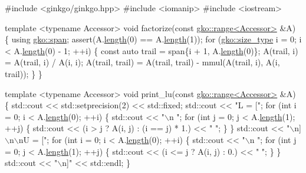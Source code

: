 \begin{DoxyCodeInclude}
\textcolor{preprocessor}{#include <ginkgo/ginkgo.hpp>}
\textcolor{preprocessor}{#include <iomanip>}
\textcolor{preprocessor}{#include <iostream>}


\textcolor{keyword}{template} <\textcolor{keyword}{typename} Accessor>
\textcolor{keywordtype}{void} factorize(\textcolor{keyword}{const} \hyperlink{classgko_1_1range}{gko::range<Accessor>} &A)
\{
    \textcolor{keyword}{using} \hyperlink{structgko_1_1span}{gko::span};
    assert(A.\hyperlink{classgko_1_1range_a3ac8b238c377da9cc05d7c728efabfc8}{length}(0) == A.\hyperlink{classgko_1_1range_a3ac8b238c377da9cc05d7c728efabfc8}{length}(1));
    \textcolor{keywordflow}{for} (\hyperlink{namespacegko_a6e5c95df0ae4e47aab2f604a22d98ee7}{gko::size\_type} i = 0; i < A.\hyperlink{classgko_1_1range_a3ac8b238c377da9cc05d7c728efabfc8}{length}(0) - 1; ++i) \{
        \textcolor{keyword}{const} \textcolor{keyword}{auto} trail = span\{i + 1, A.\hyperlink{classgko_1_1range_a3ac8b238c377da9cc05d7c728efabfc8}{length}(0)\};
        A(trail, i) = A(trail, i) / A(i, i);
        A(trail, trail) = A(trail, trail) - mmul(A(trail, i), A(i, trail));
    \}
\}


\textcolor{keyword}{template} <\textcolor{keyword}{typename} Accessor>
\textcolor{keywordtype}{void} print\_lu(\textcolor{keyword}{const} \hyperlink{classgko_1_1range}{gko::range<Accessor>} &A)
\{
    std::cout << std::setprecision(2) << std::fixed;
    std::cout << \textcolor{stringliteral}{"L = ["};
    \textcolor{keywordflow}{for} (\textcolor{keywordtype}{int} i = 0; i < A.\hyperlink{classgko_1_1range_a3ac8b238c377da9cc05d7c728efabfc8}{length}(0); ++i) \{
        std::cout << \textcolor{stringliteral}{"\(\backslash\)n  "};
        \textcolor{keywordflow}{for} (\textcolor{keywordtype}{int} j = 0; j < A.\hyperlink{classgko_1_1range_a3ac8b238c377da9cc05d7c728efabfc8}{length}(1); ++j) \{
            std::cout << (i > j ? A(i, j) : (i == j) * 1.) << \textcolor{stringliteral}{" "};
        \}
    \}
    std::cout << \textcolor{stringliteral}{"\(\backslash\)n]\(\backslash\)n\(\backslash\)nU = ["};
    \textcolor{keywordflow}{for} (\textcolor{keywordtype}{int} i = 0; i < A.\hyperlink{classgko_1_1range_a3ac8b238c377da9cc05d7c728efabfc8}{length}(0); ++i) \{
        std::cout << \textcolor{stringliteral}{"\(\backslash\)n  "};
        \textcolor{keywordflow}{for} (\textcolor{keywordtype}{int} j = 0; j < A.\hyperlink{classgko_1_1range_a3ac8b238c377da9cc05d7c728efabfc8}{length}(1); ++j) \{
            std::cout << (i <= j ? A(i, j) : 0.) << \textcolor{stringliteral}{" "};
        \}
    \}
    std::cout << \textcolor{stringliteral}{"\(\backslash\)n]"} << std::endl;
\}



\end{DoxyCodeInclude}
